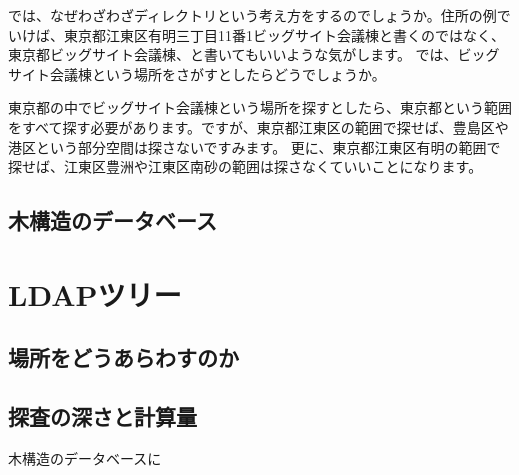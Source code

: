 では、なぜわざわざディレクトリという考え方をするのでしょうか。住所の例でいけば、東京都江東区有明三丁目11番1ビッグサイト会議棟と書くのではなく、東京都ビッグサイト会議棟、と書いてもいいような気がします。
では、ビッグサイト会議棟という場所をさがすとしたらどうでしょうか。

東京都の中でビッグサイト会議棟という場所を探すとしたら、東京都という範囲をすべて探す必要があります。ですが、東京都江東区の範囲で探せば、豊島区や港区という部分空間は探さないですみます。
更に、東京都江東区有明の範囲で探せば、江東区豊洲や江東区南砂の範囲は探さなくていいことになります。



\subsection{木構造のデータベース}

\section{LDAPツリー}

\subsection{場所をどうあらわすのか}

\subsection{探査の深さと計算量}

木構造のデータベースに